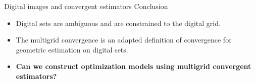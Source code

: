 \begin{frame}
	{Digital images and convergent estimators}	
	{Conclusion}	

	\begin{itemize}
		\item{Digital sets are ambiguous and are constrained to the digital grid.}\\[1em]
		\item{The multigrid convergence is an adapted definition of convergence for geometric estimation on digital sets.}\\[2em]\pause
		\item[]{\textbf{Can we construct optimization models using multigrid convergent estimators?}}
	\end{itemize}

\end{frame}
